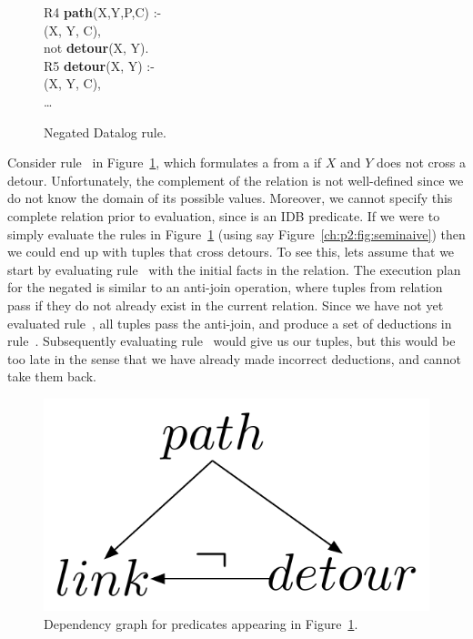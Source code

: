 \begin{figure}
\centering
\ssp
\begin{boxedminipage}{\linewidth}
R4 {\bf path}(X,Y,P,C) :- \\
(X, Y, C), \\
\datalogspace not {\bf detour}(X, Y). \\

R5 {\bf detour}(X, Y) :- \\
(X, Y, C), \\
\datalogspace \ldots 
\end{boxedminipage}
\caption{\label{ch:p2:fig:negation}Negated Datalog rule.}
\end{figure}

Consider rule~ in Figure~\ref{ch:p2:fig:negation}, which formulates a
 from a  if $X$ and $Y$ does not cross a detour.
Unfortunately, the complement of the  relation is not well-defined
since we do not know the domain of its possible values.  Moreover, we cannot
specify this complete relation prior to evaluation, since  is an IDB
predicate.  If we were to simply evaluate the rules in
Figure~\ref{ch:p2:fig:negation} (using say Figure~\ref{ch:p2:fig:seminaive})
then we could end up with  tuples that cross detours.  To see this,
lets assume that we start by evaluating rule~ with the initial facts in
the  relation.  The execution plan for the negated  is
similar to an anti-join operation, where tuples from  relation pass if
they do not already exist in the current  relation.  Since we have
not yet evaluated rule~, all  tuples pass the anti-join, and
produce a set of  deductions in rule~.  Subsequently evaluating
rule~ would give us our  tuples, but this would be too late
in the sense that we have already made incorrect deductions, and cannot take
them back.

\begin{figure} 
\ssp
\begin{center}
\includegraphics[scale=1]{figures/dependency-graph}
\caption{\label{ch:p2:fig:dependency}Dependency graph for predicates 
appearing in Figure~\ref{ch:p2:fig:negation}.}
\end{center} 
\end{figure}

